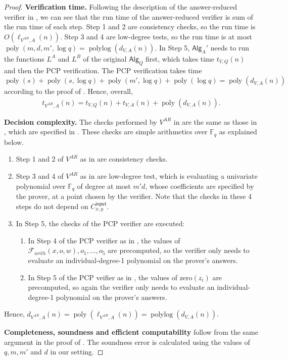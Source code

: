 \documentclass[10pt,a4paper]{article}
\theoremstyle{plain}
\theoremstyle{definition}
\newcommand{\poly} {\ensuremath{\operatorname{poly}}}
\newcommand{\polylog} {\ensuremath{\operatorname{polylog}}}
\newcommand{\1}{\mathbb{1}} %
\newcommand{\bF}{\mathbb{F}}
\newcommand{\ipt}{\mathsf{input}}
\newcommand{\Alg}{\mathsf{Alg}}
\begin{document}
\begin{proof}
    \textbf{Verification time.} Following the description of the answer-reduced verifier in \cite[Figure 14]{JNVWY'20},
    we can see that the run time of the answer-reduced verifier is sum of the run time of each step.
    Step 1 and 2 are consistency checks, so the run time is $O(\ell_{V^{AR},A}(n))$.
    Step 3 and 4 are low-degree tests, so the run time is at most $\poly(m,d,m',\log q) = \polylog( d_{V,A}(n))$.
    In Step 5, $\Alg_A'$ needs to run the functions $L^A$ and $L^B$ of the original $\Alg_Q$ first, which takes time $t_{V,Q}(n)$ and then
    the PCP verification.
    The PCP verification takes time $\poly(s) + \poly(s, \log q) + \poly(m',\log q) + \poly(\log q)= \poly(d_{V,A}(n))$ according to the proof of \cite[Theorem 10.25]{JNVWY'20}. Hence, overall,
    \begin{align*}
        t_{V^{AR},A}(n) = t_{V,Q}(n) + t_{V,A}(n) + \poly(d_{V,A}(n)).
    \end{align*}

    \textbf{Decision complexity.} The checks performed by $V^{AR}$ in \cite{10.1145/3564246.3585208} are the same as those in \cite{JNVWY'20},  
    which are specified in \cite[Figure 14]{JNVWY'20}. 
    These checks are simple arithmetics over $\bF_q$ as explained below.
    \begin{enumerate}
        \item Step 1 and 2 of $V^{AR}$ as in \cite[Figure 14]{JNVWY'20} are consistency checks.
        \item Step 3 and 4 of $V^{AR}$ as in \cite[Figure 14]{JNVWY'20} are low-degree test, which is evaluating a univariate polynomial over $\bF_q$ of degree at most $m'd$, whose coefficients are specified by the prover, at a point chosen by the verifier.
        Note that the checks in these 4 steps do not depend on $C^{\ipt}_{x,y}$.
        \item In Step 5, the checks of the PCP verifier are executed:
        \begin{enumerate}
            \item In Step 4 of the PCP verifier as in \cite[Figure 13]{JNVWY'20}, the values of $\mathcal{F}_{arith}(x,o,w), o_1, \dots, o_5$ are precomputed, so the verifier only needs to evaluate an individual-degree-1 polynomial on the prover's answers.
            \item In Step 5 of the PCP veifier as in \cite[Figure 13]{JNVWY'20}, the values of $\mathrm{zero}(z_i)$ are precomputed, so again the verifier only needs to evaluate an individual-degree-1 polynomial on the prover's answers.
        \end{enumerate}
    \end{enumerate}
    Hence, $d_{V^{AR},A}(n) = \poly(\ell_{V^{AR},A}(n)) = \polylog(d_{V,A}(n))$.

    \textbf{Completeness, soundness and efficient computability} follow from the same argument in the proof of \cite[Theorem 51]{10.1145/3564246.3585208}.
    The soundness error is calculated using the values of $q, m, m'$ and $d$ in our setting.
\end{proof}
\end{document}
